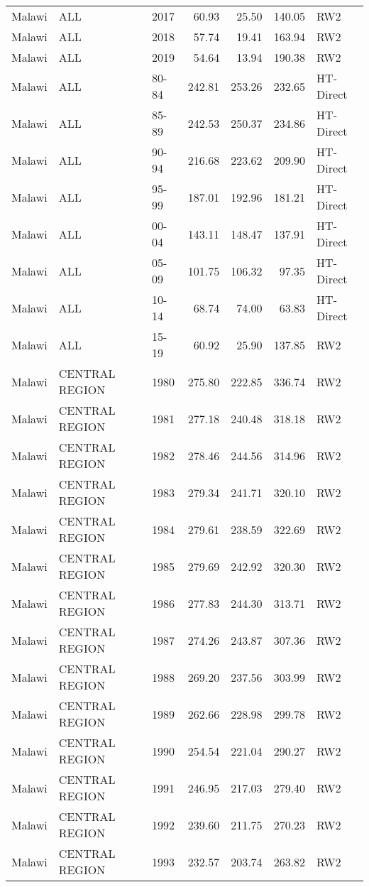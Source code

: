 \begin{longtable}{lllrrrl}
  Malawi & ALL & 2017 & 60.93 & 25.50 & 140.05 & RW2 \\ 
  Malawi & ALL & 2018 & 57.74 & 19.41 & 163.94 & RW2 \\ 
  Malawi & ALL & 2019 & 54.64 & 13.94 & 190.38 & RW2 \\ 
  Malawi & ALL & 80-84 & 242.81 & 253.26 & 232.65 & HT-Direct \\ 
  Malawi & ALL & 85-89 & 242.53 & 250.37 & 234.86 & HT-Direct \\ 
  Malawi & ALL & 90-94 & 216.68 & 223.62 & 209.90 & HT-Direct \\ 
  Malawi & ALL & 95-99 & 187.01 & 192.96 & 181.21 & HT-Direct \\ 
  Malawi & ALL & 00-04 & 143.11 & 148.47 & 137.91 & HT-Direct \\ 
  Malawi & ALL & 05-09 & 101.75 & 106.32 & 97.35 & HT-Direct \\ 
  Malawi & ALL & 10-14 & 68.74 & 74.00 & 63.83 & HT-Direct \\ 
  Malawi & ALL & 15-19 & 60.92 & 25.90 & 137.85 & RW2 \\ 
  Malawi & CENTRAL REGION & 1980 & 275.80 & 222.85 & 336.74 & RW2 \\ 
  Malawi & CENTRAL REGION & 1981 & 277.18 & 240.48 & 318.18 & RW2 \\ 
  Malawi & CENTRAL REGION & 1982 & 278.46 & 244.56 & 314.96 & RW2 \\ 
  Malawi & CENTRAL REGION & 1983 & 279.34 & 241.71 & 320.10 & RW2 \\ 
  Malawi & CENTRAL REGION & 1984 & 279.61 & 238.59 & 322.69 & RW2 \\ 
  Malawi & CENTRAL REGION & 1985 & 279.69 & 242.92 & 320.30 & RW2 \\ 
  Malawi & CENTRAL REGION & 1986 & 277.83 & 244.30 & 313.71 & RW2 \\ 
  Malawi & CENTRAL REGION & 1987 & 274.26 & 243.87 & 307.36 & RW2 \\ 
  Malawi & CENTRAL REGION & 1988 & 269.20 & 237.56 & 303.99 & RW2 \\ 
  Malawi & CENTRAL REGION & 1989 & 262.66 & 228.98 & 299.78 & RW2 \\ 
  Malawi & CENTRAL REGION & 1990 & 254.54 & 221.04 & 290.27 & RW2 \\ 
  Malawi & CENTRAL REGION & 1991 & 246.95 & 217.03 & 279.40 & RW2 \\ 
  Malawi & CENTRAL REGION & 1992 & 239.60 & 211.75 & 270.23 & RW2 \\ 
  Malawi & CENTRAL REGION & 1993 & 232.57 & 203.74 & 263.82 & RW2 \\ 

\end{longtable}
